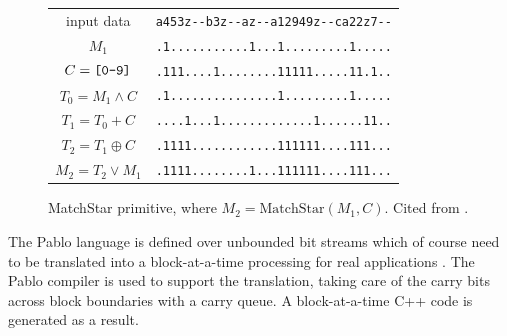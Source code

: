 \begin{figure}[tbh]
\begin{center}
\begin{tabular}{cr}\\
input data  & \verb`a453z--b3z--az--a12949z--ca22z7--`\\
$M_1$ & \verb`.1...........1...1.........1.....`\\
$C = \text{\tt [0-9]}$ & \verb`.111....1........11111.....11.1..`\\
$T_0 = M_1 \wedge C$ & \verb`.1...............1.........1.....`\\
$T_1 = T_0 + C$ & \verb`....1...1.............1......11..`\\
$T_2 = T_1 \oplus C$ & \verb`.1111............111111....111...`\\
$M_2 = T_2 \vee M_1$ & \verb`.1111........1...111111....111...`
\end{tabular}
\end{center}
\caption[MatchStar Using Bitstream Addition and Mask]{MatchStar primitive, where $M_2 = \text{MatchStar}(M_1, C)$. Cited from \cite{rob_regex}.}
\label{figure:matchstar}
\end{figure}

The Pablo language is defined over unbounded bit streams which of course need to be translated into a block-at-a-time processing for real applications \cite{rob_regex}. The Pablo compiler is used to support the translation, taking care of the carry bits across block boundaries with a carry queue. A block-at-a-time C++ code is generated as a result.

